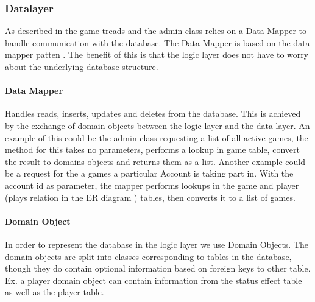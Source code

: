 \subsubsection{Datalayer}
\label{chap:dbImplementation}
As described in  the game treads and the admin class relies on a Data Mapper to handle communication with the database. The Data Mapper is based on the data mapper patten . The benefit of this is that the logic layer does not have to worry about the underlying database structure.
 
\paragraph{Data Mapper}
Handles reads, inserts, updates and deletes from the database. This is achieved by the exchange of domain objects between the logic layer and the data layer.
An example of this could be the admin class requesting a list of all active games, the method for this takes no parameters, performs a lookup in game table, convert the result to domains objects and returns them as a list.
Another example could be a request for the a games a particular Account is taking part in. With the account id as parameter, the mapper performs lookups in the game and player (plays relation in the ER diagram ) tables, then converts it to a list of games.


\paragraph{Domain Object} 
In order to represent the database in the logic layer we use Domain Objects. The domain objects are split into classes corresponding to tables in the database, though they do contain optional information based on foreign keys to other table. Ex. a player domain object can contain information from the status effect table as well as the player table.
